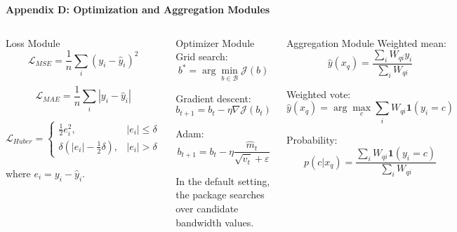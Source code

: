 \begin{frame}
    \scriptsize
    {\Large\color{mainblue}\textbf{Appendix D: Optimization and Aggregation Modules}}
    \begin{columns}[T,onlytextwidth]

        \begin{block}{Loss Module}
            \[
                \mathcal{L}_{MSE}
                =
                \frac{1}{n}\sum_i (y_i-\hat{y}_i)^2
            \]

            \[
                \mathcal{L}_{MAE}
                =
                \frac{1}{n}\sum_i |y_i-\hat{y}_i|
            \]

            \[
                \mathcal{L}_{Huber}
                =
                \begin{cases}
                    \frac{1}{2}e_i^2,                & |e_i|\leq \delta \\
                    \delta(|e_i|-\frac{1}{2}\delta), & |e_i|>\delta
                \end{cases}
            \]

            {\tiny
                where \(e_i=y_i-\hat{y}_i\).
            }
        \end{block}

        \begin{block}{Optimizer Module}
            Grid search:
            \[
                b^*
                =
                \arg\min_{b\in\mathcal{B}}
                \mathcal{J}(b)
            \]

            Gradient descent:
            \[
                b_{t+1}
                =
                b_t-\eta\nabla \mathcal{J}(b_t)
            \]

            Adam:
            \[
                b_{t+1}
                =
                b_t-\eta
                \frac{\hat{m}_t}{\sqrt{\hat{v}_t}+\varepsilon}
            \]

            {\tiny
                In the default setting, the package searches over candidate bandwidth values.
            }
        \end{block}

        \begin{block}{Aggregation Module}
            Weighted mean:
            \[
                \hat{y}(x_q)
                =
                \frac{\sum_i W_{qi}y_i}
                {\sum_i W_{qi}}
            \]

            Weighted vote:
            \[
                \hat{y}(x_q)
                =
                \arg\max_c
                \sum_i W_{qi}
                \mathbf{1}(y_i=c)
            \]

            Probability:
            \[
                p(c|x_q)
                =
                \frac{\sum_i W_{qi}\mathbf{1}(y_i=c)}
                {\sum_i W_{qi}}
            \]
        \end{block}

    \end{columns}

\end{frame}

